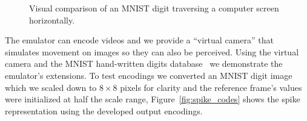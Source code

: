 \documentclass[conference]{IEEEtran}
\begin{document}
\begin{figure}[htb]
  \caption{Visual comparison of an MNIST digit traversing a computer screen horizontally.}
  \label{fig:dvs_vs_cam}
  
\end{figure}

The emulator can encode videos and we provide a ``virtual camera'' that simulates movement on images so they can also be perceived. Using the virtual camera and the MNIST hand-written digits database~\cite{mnist,mnist:web} we demonstrate the emulator's extensions. To test encodings we converted an MNIST  digit image which we scaled down to $8\times8$ pixels for clarity and the reference frame's values were initialized at half the scale range, Figure~\ref{fig:spike_codes} shows the spike representation using the developed output encodings.

\setcounter{figure}{12} %
\end{document}
